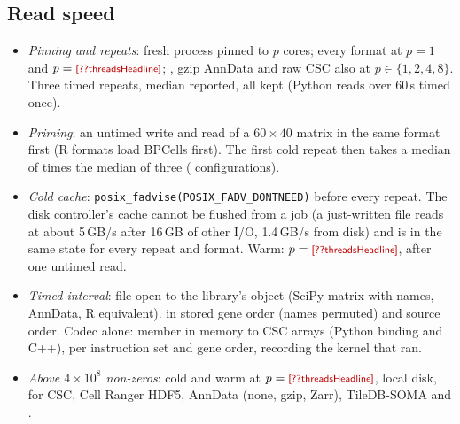 \subsection{Read speed}
\begin{itemize}\itemsep 1pt
\item \emph{Pinning and repeats}: fresh process pinned to $p$ cores; every format at $p=1$ and $p=\nm{threadsHeadline}$;
  \sone{}, gzip AnnData and raw CSC also at $p\in\{1,2,4,8\}$. Three timed repeats, median reported, all kept (Python
  reads over 60\,s timed once).
\item \emph{Priming}: an untimed write and read of a $60\times40$ matrix in the same format first (R formats load BPCells
  first). The first cold repeat then takes a median of  times the median of three
  ( configurations).
\item \emph{Cold cache}: \texttt{posix\_fadvise(POSIX\_FADV\_DONTNEED)} before every repeat. The disk controller's cache
  cannot be flushed from a job (a just-written file reads at about 5\,GB/s after 16\,GB of other I/O, 1.4\,GB/s from
  disk) and is in the same state for every repeat and format. Warm: $p=\nm{threadsHeadline}$, after one untimed read.
\item \emph{Timed interval}: file open to the library's object (SciPy matrix with names, AnnData, R equivalent). \sone{}
  in stored gene order (names permuted) and source order. Codec alone: member in memory to CSC arrays (Python binding
  and C++), per instruction set and gene order, recording the kernel that ran.
\item \emph{Above $4\times10^8$ non-zeros}: cold and warm at $p=\nm{threadsHeadline}$, local disk, for CSC, Cell Ranger
  HDF5, AnnData (none, gzip, Zarr), TileDB-SOMA and \sone{}.
\end{itemize}


